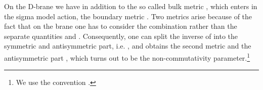 \documentclass[a4paper,11pt]{article}               \def\new#1\endnew{{\bf #1}}
\providecommand {\cF} {{\cal F}}
\begin{document}
On the D-brane we have in addition to the so called bulk metric 
\coordHE{}, which enters in the sigma model action, the
boundary metric \coordHE{}. Two metrics arise because of the fact that
on the brane one has to consider the combination
\myHighlight{$M_{\mu\nu} = g_{\mu\nu} + \cF_{\mu\nu}$}\coordHE{} rather than the separate
quantities \coordHE{} and \myHighlight{$\cF$}\coordHE{}. Consequently, one can split the inverse of \coordHE{}
into the symmetric and antisymmetric part, i.e. 
\coordHE{}, and obtains
the second metric \coordHE{} and the antisymmetric part \myHighlight{$\Theta$}\coordHE{}, which turns out
to be the non-commutativity parameter.\footnote{%
  We use the convention \coordHE{}.
}
\end{document}
